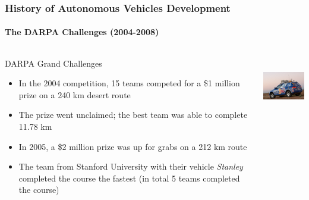 \begin{frame}
\frametitle{History of Autonomous Vehicles Development}
\framesubtitle{The DARPA Challenges (2004-2008)}
\begin{columns}[T]
    \begin{column}{.65\textwidth}
    DARPA Grand Challenges\footnotemark[1]
    \begin{itemize}
        \item In the 2004 competition, 15 teams competed for a \$1 million prize
            on a 240 km desert route
        \item The prize went unclaimed; the best team was able to complete
            11.78 km
        \item In 2005, a \$2 million prize was up for grabs on a 212 km route
        \item The team from Stanford University with their vehicle
            \emph{Stanley} completed the course the fastest (in total 5 teams
            completed the course)
    \end{itemize}
    \end{column}
    \begin{column}{.35\textwidth}
    \centering
    \includegraphics[height=2.5cm]{images/darpa_stanley.jpg} \\
    \tiny{\cite{DARPAStanley}}
    \end{column}
\end{columns}
\end{frame}
    
